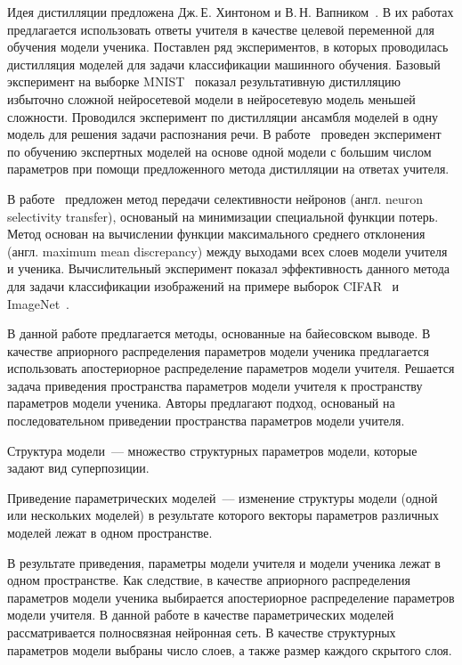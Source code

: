 \documentclass[12pt]{a&t}
\begin{document}
Идея дистилляции предложена Дж.\,Е. Хинтоном и В.\,Н. Вапником~\cite{Hinton2015, Vapnik2015, Lopez2016}. В их работах предлагается использовать ответы учителя в качестве целевой переменной для обучения модели ученика.
Поставлен ряд экспериментов, в которых проводилась дистилляция моделей для задачи классификации машинного обучения.
Базовый эксперимент на выборке MNIST~\cite{mnist} показал результативную дистилляцию избыточно сложной нейросетевой модели в нейросетевую модель меньшей сложности.
Проводился эксперимент по дистилляции ансамбля моделей в одну модель для решения задачи распознания речи. В работе~\cite{Hinton2015} проведен эксперимент по обучению экспертных моделей на основе одной модели с большим числом параметров при помощи предложенного метода дистилляции на ответах учителя.

В работе~\cite{Zehao2017} предложен метод передачи селективности нейронов (англ. neuron selectivity transfer), основаный на минимизации специальной функции потерь.
Метод основан на вычислении функции максимального среднего отклонения (англ. maximum mean discrepancy) между выходами всех слоев модели учителя и ученика. Вычислительный эксперимент показал эффективность данного метода для задачи классификации изображений на примере выборок CIFAR~\cite{cifar10} и ImageNet~\cite{imagenet}.

В данной работе предлагается методы, основанные на байесовском выводе.
В качестве априорного распределения параметров модели ученика предлагается использовать апостериорное распределение параметров модели учителя.
Решается задача приведения пространства параметров модели учителя к пространству параметров модели ученика.
Авторы предлагают подход, основаный на последовательном приведении пространства параметров модели учителя. 
\begin{definition}
\label{def:structure}
Структура модели~--- множество структурных параметров модели, которые задают вид суперпозиции.
\end{definition}
\begin{definition}
\label{def:sopos}
Приведение параметрических моделей~--- изменение структуры модели (одной или нескольких моделей) в результате которого векторы параметров различных моделей лежат в одном пространстве.
\end{definition}
В результате приведения, параметры модели учителя и модели ученика лежат в одном пространстве.
Как следствие, в качестве априорного распределения параметров модели ученика выбирается апостериорное распределение параметров модели учителя.
В данной работе в качестве параметрических моделей рассматривается полносвязная нейронная сеть.
В качестве структурных параметров модели выбраны число слоев, а также размер каждого скрытого слоя.
\end{document}
